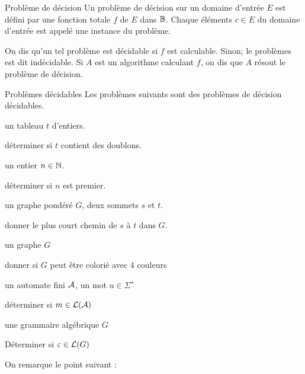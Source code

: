 \documentclass[a4paper,french,bookmarks]{book}
\begin{document}
    
    \begin{definition}{Problème de décision}{}
        Un problème de décision sur un domaine d'entrée $E$ est défini par une fonction totale $f$ de $E$ dans $\mathbb{B}$. Chaque éléments $c\in E$ du domaine d'entrée est appelé une instance du problème.
        
        On dis qu'un tel problème est décidable si $f$ est calculable. Sinon; le problèmes est dit indécidable. Si $A$ est un algorithme calculant $f$, on dis que $A$ résout le problème de décision.
    \end{definition}
    
    \begin{example}{Problèmes décidables}{}
        Les problèmes suivants sont des problèmes de décision décidables.
        \begin{enumerate}
            \itt{} un tableau $t$ d'entiers.
            
                 déterminer si $t$ contient des doublons.
                
            \itt{} un entier $n \in \mathbb{N}$.
            
                 déterminer si $n$ est premier.
                
            \itt{} un graphe pondéré $G$, deux sommets $s$ et $t$.
            
                 donner le plus court chemin de $s$ à $t$ dans $G$.
                
            \itt{} un graphe $G$
            
                 donner si $G$ peut être colorié avec $4$ couleurs
                
            \itt{} un automate fini $\mathcal{A}$, un mot $u \in \Sigma^\star$
            
                 déterminer si $m \in \mathcal{L}\!\left(\mathcal{A}\right)$
                
            \itt{} une grammaire algébrique $G$
                
                 Déterminer si $\varepsilon \in \mathcal{L}\!\left(G\right)$ 
        \end{enumerate}
    \end{example}
    
    On remarque le point suivant :
    
\end{document}
